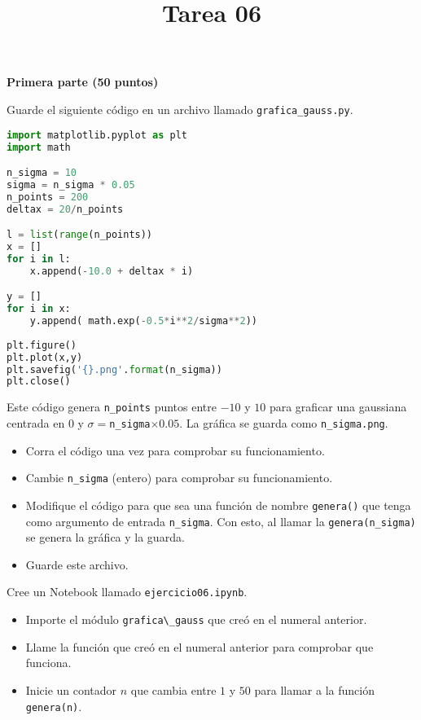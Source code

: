 \documentclass{article}
\title{Tarea 06}
\begin{document}
\maketitle

\textbf{Primera parte (50 puntos)}

Guarde el siguiente código en un archivo llamado \texttt{grafica\_gauss.py}.

\begin{lstlisting}[language=Python, caption=grafica\_gauss.py]
import matplotlib.pyplot as plt
import math

n_sigma = 10
sigma = n_sigma * 0.05
n_points = 200
deltax = 20/n_points

l = list(range(n_points))
x = []
for i in l:
    x.append(-10.0 + deltax * i)

y = []
for i in x:
    y.append( math.exp(-0.5*i**2/sigma**2))
    
plt.figure()
plt.plot(x,y)    
plt.savefig('{}.png'.format(n_sigma))
plt.close()

\end{lstlisting}

Este código genera \verb"n_points" puntos entre $-10$ y $10$ para graficar una gaussiana
centrada en $0$ y $\sigma=$\verb"n_sigma"$\times 0.05$.
La gr\'afica se guarda como \verb"n_sigma.png".

\begin{itemize}
    \item Corra el c\'odigo una vez para comprobar su funcionamiento.
    \item Cambie \verb"n_sigma" (entero) para comprobar su funcionamiento.
    \item Modifique el código para que sea una funci\'on de nombre \verb"genera()"
      que tenga como argumento  de entrada \verb"n_sigma". 
      Con esto, al llamar la \verb"genera(n_sigma)" se genera la gráfica y la guarda.
    \item Guarde este archivo.
\end{itemize}

Cree un Notebook llamado \verb"ejercicio06.ipynb".

\begin{itemize}
    \item Importe el módulo \verb"grafica\_gauss" que creó en el numeral anterior.
    \item Llame la función que creó en el numeral anterior para comprobar que funciona.
    \item Inicie un contador $n$ que cambia entre $1$ y $50$ para llamar a la funci\'on
      \verb"genera(n)".
\end{itemize}
 
\end{document}
